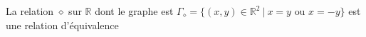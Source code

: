La relation $\diamond$ sur $\mathbb R$ dont le graphe est $\Gamma_\diamond=\{(x,y)\in\mathbb R^2\:|\: x=y\text{ ou } x=-y\}$ est une relation d'équivalence

\begin{reponses}
\end{reponses}

